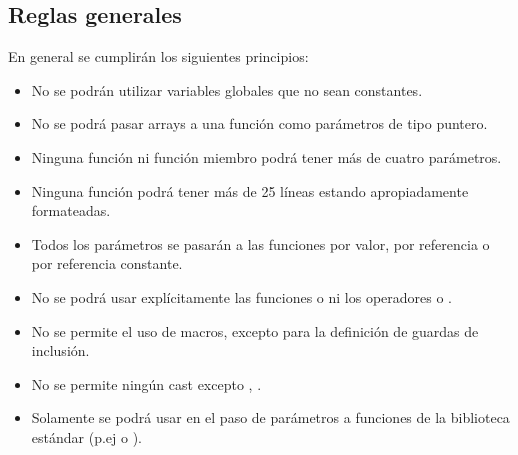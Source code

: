 \subsection{Reglas generales}

En general se cumplirán los siguientes principios:

\begin{itemize}

\item No se podrán utilizar variables globales que no sean constantes.

\item No se podrá pasar arrays a una función como parámetros de tipo puntero.

\item Ninguna función ni función miembro podrá tener más de cuatro parámetros.

\item Ninguna función podrá tener más de 25 líneas estando apropiadamente
formateadas.

\item Todos los parámetros se pasarán a las funciones por valor, por referencia
o por referencia constante.

\item No se podrá usar explícitamente las funciones 
o  ni los operadores  o .

\item No se permite el uso de macros, excepto para la definición de guardas de inclusión.

\item No se permite ningún cast excepto , 
.

\item Solamente se podrá usar  en el paso de parámetros a funciones
de la biblioteca estándar (p.ej  o ).

\end{itemize}
